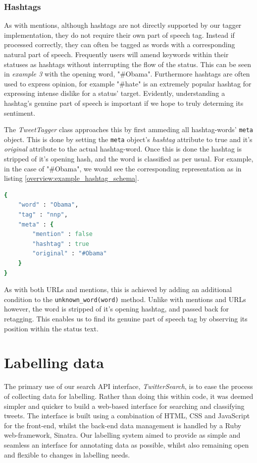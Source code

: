 \subsubsection{Hashtags}

As with mentions, although hashtags are not directly supported by our tagger implementation, they do not require their own part of speech tag. Instead if processed correctly, they can often be tagged as words with a corresponding natural part of speech. Frequently users will amend keywords within their statuses as hashtags without interrupting the flow of the status. This can be seen in \emph{example 3} with the opening word, "\#Obama". Furthermore hashtags are often used to express opinion, for example "\#hate" is an extremely popular hashtag for expressing intense dislike for a status' target. Evidently, understanding a hashtag's genuine part of speech is important if we hope to truly determing its sentiment.

The \emph{TweetTagger} class approaches this by first ammeding all hashtag-words' \texttt{meta} object. This is done by setting the \texttt{meta} object's \emph{hashtag} attribute to true and it's \emph{original} attribute to the actual hashtag-word. Once this is done the hashtag is stripped of it's opening hash, and the word is classified as per usual. For example, in the case of "\#Obama", we would see the corresponding representation as in listing \ref{overview:example_hashtag_schema}.

\begin{lstlisting}[language=Ruby, numbers=none, caption={Example JSON structure for representing a hashtag word}, label=overview:example_hashtag_schema]
{
	"word" : "Obama", 
	"tag" : "nnp",
	"meta" : {
		"mention" : false
		"hashtag" : true
		"original" : "#Obama"
	}
}
\end{lstlisting}

As with both URLs and mentions, this is achieved by adding an additional condition to the \texttt{unknown\_word(word)} method. Unlike with mentions and URLs however, the word is stripped of it's opening hashtag, and passed back for retagging. This enables us to find its genuine part of speech tag by observing its position within the status text.

\section{Labelling data}
\label{retrieval:labelling}

The primary use of our search API interface, \emph{TwitterSearch}, is to ease the process of collecting data for labelling. Rather than doing this within code, it was deemed simpler and quicker to build a web-based interface for searching and classifying tweets. The interface is built using a combination of HTML, CSS and JavaScript for the front-end, whilst the back-end data management is handled by a Ruby web-framework, Sinatra. Our labelling system aimed to provide as simple and seamless an interface for annotating data as possible, whilst also remaining open and flexible to changes in labelling needs.

